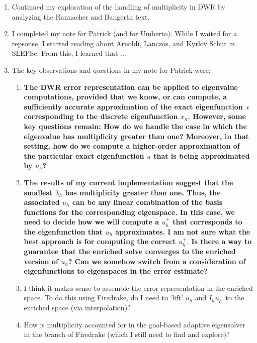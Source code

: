 \documentclass[12pt,a4paper]{article}
\begin{document}
\begin{enumerate}
    \item Continued my exploration of the handling of multiplicity in DWR by analyzing the Rannacher and Bangerth text.

    \item I completed my note for Patrick (and for Umberto). While I waited for a repsonse, I started reading about Arnoldi, Lanczos, and Kyrlov Schur in SLEPSc. From this, I learned that ...
    
    \item The key observations and questions in my note for Patrick were:

    \begin{enumerate}

    \item \textbf{The DWR error representation can be applied to eigenvalue computations, provided that we know, or can compute, a sufficiently accurate approximation of the exact eigenfunction $x$ corresponding to the discrete eigenfunction $x_h$. However, some key questions remain: How do we handle the case in which the eigenvalue has multiplicity greater than one? Moreover, in that setting, how do we compute a higher-order approximation of the particular exact eigenfunction $u$ that is being approximated by $u_h$?}
    
    \item \textbf{The results of my current implementation suggest that the smallest $\lambda_h$ has multiplicity greater than one. Thus, the associated $u_h$ can be any linear combination of the basis functions for the corresponding eigenspace. In this case, we need to decide how we will compute a $u_h^+$ that corresponds to the eigenfunction that $u_h$ approximates. I am not sure what the best approach is for computing the correct $u_h^+.$ Is there a way to guarantee that the enriched solve converges to the enriched version of $u_h$? Can we somehow switch from a consideration of eigenfunctions to eigenspaces in the error estimate?}

    \item I think it makes sense to assemble the error representation in the enriched space. To do this using Firedrake, do I need to `lift' $u_h$ and $I_h u_h^+$ to the enriched space (via interpolation)?
    
    \item How is multiplicity accounted for in the goal-based adaptive eigensolver in the branch of Firedrake (which I still need to find and explore)? 
    

\end{enumerate}
\end{enumerate}
\end{document}
